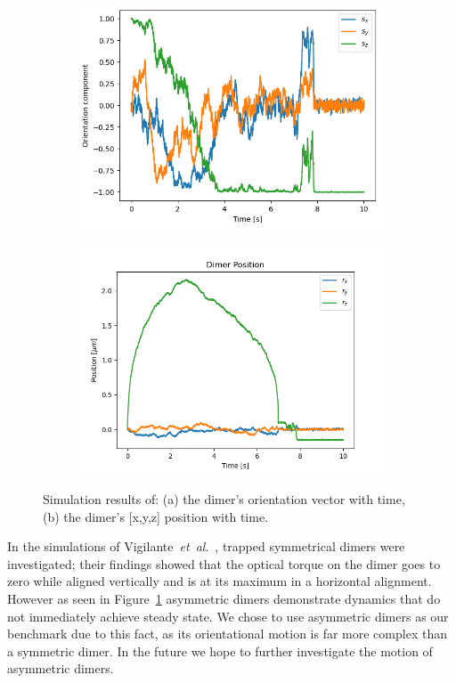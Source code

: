 \documentclass[final,  3p]{elsarticle}
\begin{document}
\begin{figure}[h]
	\centering
	\begin{subfigure}{0.45\textwidth}
		\subcaption{}
		\includegraphics[width =\textwidth]{./Images/fig7a.png}
	\end{subfigure}
	\begin{subfigure}{0.45\textwidth}
		\subcaption{}
		\includegraphics[width=\textwidth]{./Images/fig7b.png}
	\end{subfigure}
	\caption{Simulation results of: (a) the dimer's orientation vector with time, (b) the dimer's [x,y,z] position with time.}
	\label{fig:motion}
\end{figure}

In the simulations of Vigilante~\emph{et~al}.\ \cite{Vigilante2020Brownian_OT}, trapped symmetrical dimers were investigated; their findings showed that the optical torque on the dimer goes to zero while aligned vertically and is at its maximum in a horizontal alignment. However as seen in Figure~\ref{fig:motion} asymmetric dimers demonstrate dynamics that do not immediately achieve steady state. We chose to use asymmetric dimers as our benchmark due to this fact, as its orientational motion is far more complex than a symmetric dimer. In the future we hope to further investigate the motion of asymmetric dimers. 
\end{document}
